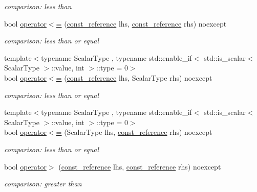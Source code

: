 \begin{DoxyCompactItemize}
\begin{DoxyCompactList}\small\item\em comparison\+: less than \end{DoxyCompactList}\item 
bool \hyperlink{classnlohmann_1_1basic__json_a5c8bb5200f5eac10d31e26be46e5b1ac}{operator$<$=} (\hyperlink{classnlohmann_1_1basic__json_ab8a1c33ee7b154fc41ca2545aa9724e6}{const\+\_\+reference} lhs, \hyperlink{classnlohmann_1_1basic__json_ab8a1c33ee7b154fc41ca2545aa9724e6}{const\+\_\+reference} rhs) noexcept
\begin{DoxyCompactList}\small\item\em comparison\+: less than or equal \end{DoxyCompactList}\item 
{\footnotesize template$<$typename Scalar\+Type , typename std\+::enable\+\_\+if$<$ std\+::is\+\_\+scalar$<$ Scalar\+Type $>$\+::value, int $>$\+::type  = 0$>$ }\\bool \hyperlink{classnlohmann_1_1basic__json_ae7bce6989e2bf72aa0784ca6755e22a9}{operator$<$=} (\hyperlink{classnlohmann_1_1basic__json_ab8a1c33ee7b154fc41ca2545aa9724e6}{const\+\_\+reference} lhs, Scalar\+Type rhs) noexcept
\begin{DoxyCompactList}\small\item\em comparison\+: less than or equal \end{DoxyCompactList}\item 
{\footnotesize template$<$typename Scalar\+Type , typename std\+::enable\+\_\+if$<$ std\+::is\+\_\+scalar$<$ Scalar\+Type $>$\+::value, int $>$\+::type  = 0$>$ }\\bool \hyperlink{classnlohmann_1_1basic__json_a4e96b98c1f8dfccaaa94aa0d5e77427c}{operator$<$=} (Scalar\+Type lhs, \hyperlink{classnlohmann_1_1basic__json_ab8a1c33ee7b154fc41ca2545aa9724e6}{const\+\_\+reference} rhs) noexcept
\begin{DoxyCompactList}\small\item\em comparison\+: less than or equal \end{DoxyCompactList}\item 
bool \hyperlink{classnlohmann_1_1basic__json_a87db51b6b936fb2ea293cdbc8702dcb8}{operator$>$} (\hyperlink{classnlohmann_1_1basic__json_ab8a1c33ee7b154fc41ca2545aa9724e6}{const\+\_\+reference} lhs, \hyperlink{classnlohmann_1_1basic__json_ab8a1c33ee7b154fc41ca2545aa9724e6}{const\+\_\+reference} rhs) noexcept
\begin{DoxyCompactList}\small\item\em comparison\+: greater than \end{DoxyCompactList}\item 

\end{DoxyCompactItemize}
